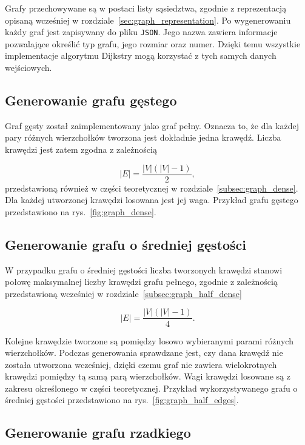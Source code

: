 Grafy przechowywane są w postaci listy sąsiedztwa, zgodnie z reprezentacją opisaną wcześniej w rozdziale~\ref{sec:graph_representation}. Po wygenerowaniu każdy graf jest zapisywany do pliku \texttt{JSON}. Jego nazwa zawiera informacje pozwalające określić typ grafu, jego rozmiar oraz numer. Dzięki temu wszystkie implementacje algorytmu Dijkstry mogą korzystać z tych samych danych wejściowych.

\subsection{Generowanie grafu gęstego}

Graf gęsty został zaimplementowany jako graf pełny. Oznacza to, że dla każdej pary różnych wierzchołków tworzona jest dokładnie jedna krawędź. Liczba krawędzi jest zatem zgodna z zależnością

\begin{equation}
    |E| = \frac{|V|(|V|-1)}{2},
\end{equation}
\noindent
przedstawioną również w części teoretycznej w rozdziale~\ref{subsec:graph_dense}. Dla każdej utworzonej krawędzi losowana jest jej waga. Przykład grafu gęstego przedstawiono na rys.~\ref{fig:graph_dense}.
\newpage

\subsection{Generowanie grafu o średniej gęstości}

W przypadku grafu o średniej gęstości liczba tworzonych krawędzi stanowi połowę maksymalnej liczby krawędzi grafu pełnego, zgodnie z zależnością przedstawioną wcześniej w rozdziale~\ref{subsec:graph_half_dense}

\begin{equation}
    |E| = \frac{|V|(|V|-1)}{4}.
\end{equation}

Kolejne krawędzie tworzone są pomiędzy losowo wybieranymi parami różnych wierzchołków. Podczas generowania sprawdzane jest, czy dana krawędź nie została utworzona wcześniej, dzięki czemu graf nie zawiera wielokrotnych krawędzi pomiędzy tą samą parą wierzchołków. Wagi krawędzi losowane są z zakresu określonego w części teoretycznej. Przykład wykorzystywanego grafu o średniej gęstości przedstawiono na rys.~\ref{fig:graph_half_edges}.

\subsection{Generowanie grafu rzadkiego}

